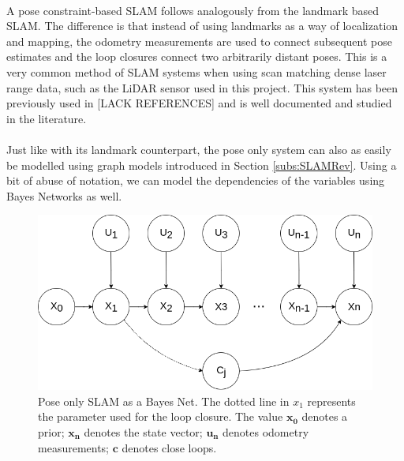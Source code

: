\documentclass[12pt]{article}
\begin{document}
	\paragraph{}
	A pose constraint-based SLAM follows analogously from the landmark based SLAM. The difference is that instead of using landmarks as a way of localization and mapping, the odometry measurements are used to connect subsequent pose estimates and the loop closures connect two arbitrarily distant poses. This is a very common method of SLAM systems when using scan matching dense laser range data, such as the LiDAR sensor used in this project. This system has been previously used in [LACK REFERENCES] and is well documented and studied in the literature. 
	\paragraph{}
	Just like with its landmark counterpart, the pose only system can also as easily be modelled using graph models introduced in Section \ref{subs:SLAMRev}. Using a bit of abuse of notation, we can model the dependencies of the variables using Bayes Networks as well.
	
	\begin{figure}
		\begin{minipage}{0.65\textwidth}
			\centering
			\includegraphics[width=\textwidth]{BayesNetSLAMPoseOnly}
		\end{minipage} \hfill
		\begin{minipage}{0.35\textwidth}
			\centering
			\caption{Pose only SLAM as a Bayes Net. The dotted line in $x_1$ represents the parameter used for the loop closure. The value $\mathbf{x_0}$ denotes a prior; $\mathbf{x_n}$ denotes the state vector; $\mathbf{u_n}$ denotes odometry measurements; $\mathbf{c}$ denotes close loops.}
			\label{fig:slam1}
		\end{minipage}				
	\end{figure}
\end{document}
